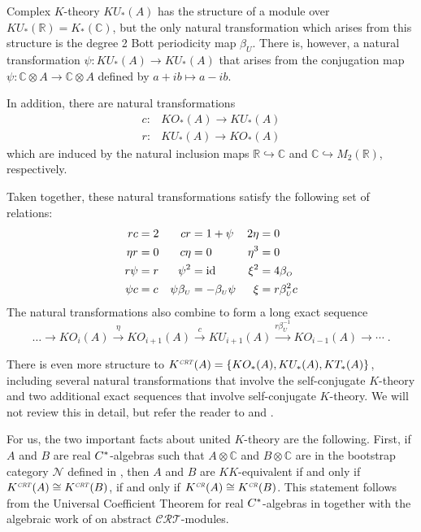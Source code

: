 \documentclass[12pt, reqno]{amsart}
\theoremstyle{definition}
\def\R{{\mathbb R}}
\def\C{{\mathbb C}}
\def\so{_{\scriptscriptstyle O}}
\def\su{_{\scriptscriptstyle U}}
\def\crr{^{\scriptscriptstyle {\it CR}}}
\def\crt{^{\scriptscriptstyle {\it CRT}}}
\def\id{\text {id} \,}
\begin{document}
Complex $K$-theory $KU_*(A)$ has the structure of a module over $KU_*(\R) = K_*(\C)$, but the only natural transformation which arises from this structure is the degree 2 Bott periodicity map $\beta\su$. There is, however, a natural transformation $\psi \colon KU_*(A) \rightarrow KU_*(A)$ that arises from the conjugation map $\psi \colon \C \otimes A \rightarrow \C \otimes A$ defined by $a + ib \mapsto a - ib$.

In addition, there are natural transformations
\begin{align*}
c \colon & KO_*(A) \rightarrow KU_*(A) \\
r \colon & KU_*(A) \rightarrow KO_*(A) 
\end{align*}
which are induced by the natural inclusion maps $\R \hookrightarrow \C$ and $\C \hookrightarrow M_2(\R)$, respectively. 

Taken together, these natural transformations satisfy the following set of relations:
\begin{align*}
\label{eq:natural-transformations}
rc &= 2  & cr &= 1 + \psi &2 \eta &= 0  \notag \\
\eta r &= 0 & c \eta&= 0 &  \eta^3 &= 0    \notag \\
r \psi &= r & \psi^2 &= \id &  \xi^2 &= 4 \beta\so \\ 
\psi c &= c & \psi \beta\su &= -\beta\su \psi & \xi &= r \beta\su^2 c \notag 
\end{align*} 
The natural transformations also combine to form a long exact sequence
\begin{equation}
\label{eq:CR-LES}
\dots \rightarrow
KO_{i}( A) \xrightarrow{\eta} 
KO_{i+1}( A) \xrightarrow{c} 
KU_{i+1}( A) \xrightarrow{r \beta\su^{-1}} 
KO_{i-1}(A) \rightarrow
\cdots  \; .
\end{equation}

There is even more structure to $K\crt(A) = \{ KO_*(A), KU_*(A), KT_*(A) \}$, including several natural transformations that involve the self-conjugate $K$-theory and two additional exact sequences that involve self-conjugate $K$-theory. We will not review this in detail, but refer the reader to \cite{Boer2002} and \cite{bousfield90}.

For us, the two important facts about united $K$-theory are the following. First, if $A$ and $B$ are real $C \sp *$-algebras such that $A \otimes \C$ and $B \otimes \C$ are in the bootstrap category $\mathcal{N}$ defined in \cite{schochet87}, then $A$ and $B$ are $KK$-equivalent if and only if $K\crt(A) \cong K\crt(B)$, if and only if $K\crr(A) \cong K\crr(B)$. This statement follows from the Universal Coefficient Theorem for real $C \sp *$-algebras in \cite{Boer2004} together with the algebraic work of \cite{hewitt} on abstract $\mathcal{CRT}$-modules.
\end{document}
